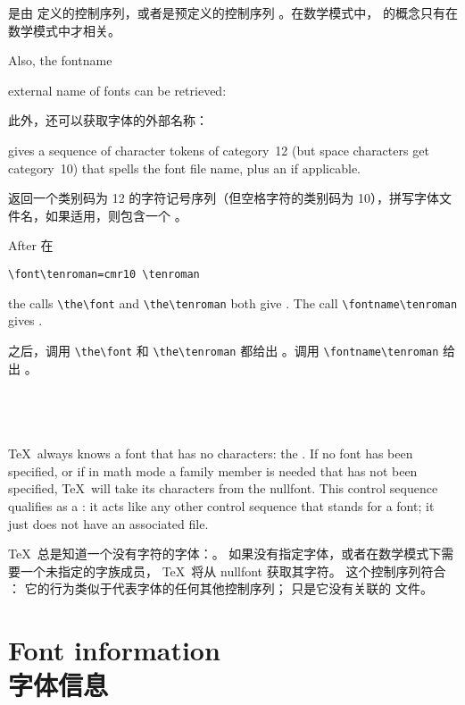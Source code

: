  是由  定义的控制序列，或者是预定义的控制序列 。在数学模式中， 的概念只有在数学模式中才相关。

Also, the 
\cstoidx fontname\par
external name of fonts can be retrieved:

此外，还可以获取字体的外部名称：
\begin{Disp}\end{Disp}
gives a sequence of character tokens of category~12
(but space characters get category~10) that spells the font file
name, plus an  if applicable.

返回一个类别码为 12 的字符记号序列（但空格字符的类别码为 10），拼写字体文件名，如果适用，则包含一个 。

\begin{example} After 在
\begin{verbatim}
\font\tenroman=cmr10 \tenroman
\end{verbatim}
the calls
\verb>\the\font> and \verb>\the\tenroman> both give .
The call \verb>\fontname\tenroman> gives .

之后，调用 \verb>\the\font> 和 \verb>\the\tenroman> 都给出 。调用 \verb>\fontname\tenroman> 给出 。
\end{example}



\subsection{\\}

\TeX\ always knows a font that has no characters: the .
If no font has been specified, or if in math mode a family member
is needed that has not been specified, 
\TeX\ will take its characters from the nullfont.
This control sequence qualifies as a :
it acts like any other control sequence that stands for a font;
it just does not have an associated  file.

\TeX\ 总是知道一个没有字符的字体：。
如果没有指定字体，或者在数学模式下需要一个未指定的字族成员，
\TeX\ 将从 nullfont 获取其字符。
这个控制序列符合 ：
它的行为类似于代表字体的任何其他控制序列；
只是它没有关联的  文件。

\section{Font information\\字体信息}

